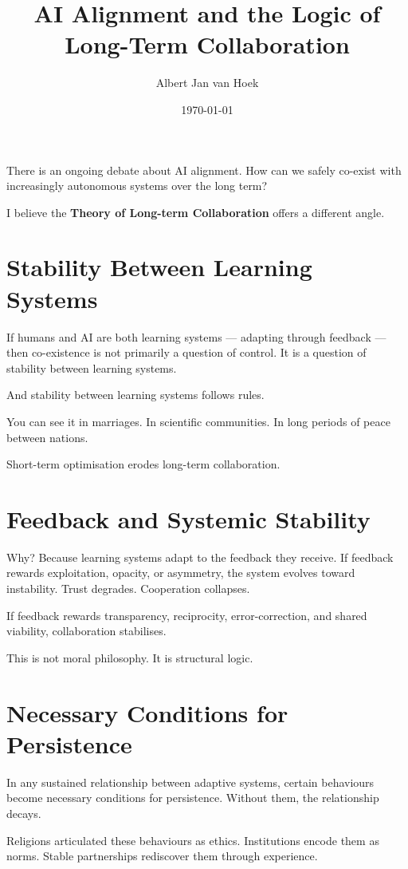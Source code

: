 \documentclass{article}
\title{AI Alignment and the Logic of Long-Term Collaboration}
\author{Albert Jan van Hoek}
\date{\today}
\begin{document}
\maketitle

There is an ongoing debate about AI alignment.
How can we safely co-exist with increasingly autonomous systems over the long term?

I believe the \textbf{Theory of Long-term Collaboration} offers a different angle.

\section*{Stability Between Learning Systems}

If humans and AI are both learning systems — adapting through feedback — then co-existence is not primarily a question of control. It is a question of stability between learning systems.

And stability between learning systems follows rules.

You can see it in marriages.
In scientific communities.
In long periods of peace between nations.

Short-term optimisation erodes long-term collaboration.

\section*{Feedback and Systemic Stability}

Why?
Because learning systems adapt to the feedback they receive.
If feedback rewards exploitation, opacity, or asymmetry, the system evolves toward instability. Trust degrades. Cooperation collapses.

If feedback rewards transparency, reciprocity, error-correction, and shared viability, collaboration stabilises.

This is not moral philosophy.
It is structural logic.

\section*{Necessary Conditions for Persistence}

In any sustained relationship between adaptive systems, certain behaviours become necessary conditions for persistence. Without them, the relationship decays.

Religions articulated these behaviours as ethics.
Institutions encode them as norms.
Stable partnerships rediscover them through experience.
\end{document}
